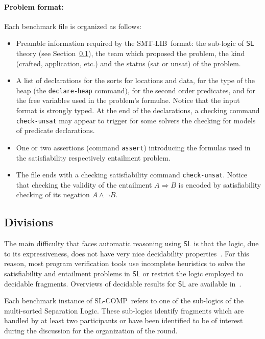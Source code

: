 \documentclass[orivec]{llncs}
\newcommand{\limp}{\Rightarrow}
\newcommand{\seplog}{\mathsf{SL}}
\newcommand{\smtlib}{\textsf{SMT-LIB}}
\newcommand{\slcomp}{\textsf{SL-COMP}}
\begin{document}
\paragraph{Problem format:} Each benchmark file is organized as follows:
\begin{itemize}
\item Preamble information required by the \smtlib\ format: the sub-logic
of $\seplog$ theory (see Section~\ref{ssec:div}), 
the team which proposed the problem, the kind (crafted, application, etc.) and 
the status (sat or unsat) of the problem.  

\item A list of declarations for the sorts for locations and data, for
the type of the heap (the \texttt{declare-heap} command), for
the second order predicates, and for the free variables used in the problem's formulae.
Notice that the input format is strongly typed. 
At the end of the declarations, a checking command \texttt{check-unsat} may appear to
trigger for some solvers the checking for models of predicate declarations.

\item One or two assertions (command \texttt{assert}) introducing the formulas
used in the satisfiability respectively entailment problem. 

\item The file ends with a checking satisfiability command \texttt{check-unsat}.
Notice that checking the validity of the entailment $A\limp B$ is encoded 
by satisfiability checking of its negation $A \land \lnot B$.
\end{itemize}


\subsection{Divisions}
\label{ssec:div}

The main difficulty that faces automatic reasoning using $\seplog$
is that the logic, due to its expressiveness, does not have very nice decidability properties~\cite{AntonopoulosGHKO14}.
For this reason, most program verification tools use incomplete heuristics to solve the satisfiability and entailment problems in $\seplog$ or restrict the logic employed to decidable fragments.
Overviews of decidable results for $\seplog$ are available in~\cite{SighireanuC14,DBLP:journals/jancl/DemriD15}.

Each benchmark instance of \slcomp\ refers to one of the sub-logics of the
multi-sorted Separation Logic. These sub-logics identify fragments 
which are handled by at least two participants or have been identified
to be of interest during the discussion for the organization of the round.
\end{document}
